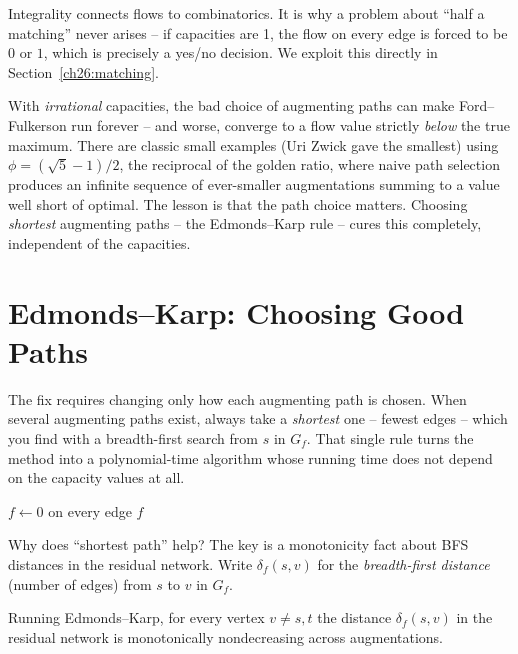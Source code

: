 Integrality connects flows to combinatorics. It is
why a problem about ``half a matching'' never arises -- if capacities are 1, the
flow on every edge is forced to be $0$ or $1$, which is precisely a yes/no
decision. We exploit this directly in Section~\ref{ch26:matching}.

\begin{trapbox}
With \emph{irrational} capacities, the bad choice of augmenting paths can make
Ford--Fulkerson run forever -- and worse, converge to a flow value strictly
\emph{below} the true maximum. There are classic small examples (Uri Zwick gave the smallest) using
$\phi = (\sqrt5-1)/2$, the reciprocal of the golden ratio, where naive path selection produces an
infinite sequence of ever-smaller augmentations summing to a value well short
of optimal. The lesson is that the path choice matters. Choosing \emph{shortest} augmenting paths -- the Edmonds--Karp rule
-- cures this completely, independent of the capacities.
\end{trapbox}

\section{Edmonds--Karp: Choosing Good Paths}
\label{ch26:edmonds-karp}

The fix requires changing only how each augmenting path is chosen. When several augmenting paths exist,
always take a \emph{shortest} one -- fewest edges -- which you find with a
breadth-first search from $s$ in $G_f$. That single rule turns the method into a
polynomial-time algorithm whose running time does not depend on the capacity
values at all.

\begin{algorithm}[H]
\caption{\textsc{Edmonds-Karp}$(G,s,t)$}
$f \gets 0$ on every edge\;
\Return $f$\;
\end{algorithm}

Why does ``shortest path'' help? The key is a monotonicity fact about BFS
distances in the residual network. Write $\delta_f(s,v)$ for the
\emph{breadth-first distance} (number of edges) from $s$ to $v$ in $G_f$.

\begin{lemma}
\label{ch26:lemma-distances}
Running Edmonds--Karp, for every vertex $v \neq s,t$ the distance
$\delta_f(s,v)$ in the residual network is monotonically nondecreasing across
augmentations.
\end{lemma}

